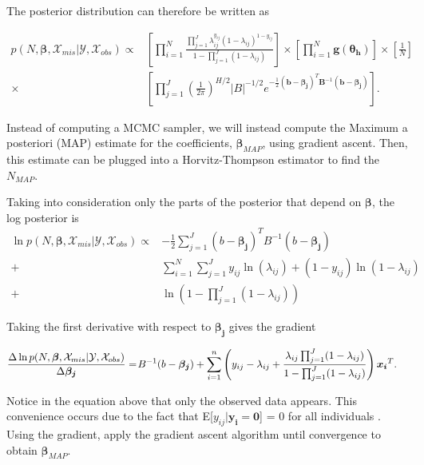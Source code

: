 \documentclass[
  12pt,
]{article}
\begin{document}
The posterior distribution can therefore be written as

\begin{align}
\label{eqn:condposteriorderivevalues}
\nonumber p(N,\boldsymbol{\beta},\mathcal{X}_{mis}|\mathcal{Y},\mathcal{X}_{obs}) \propto &  \left[\prod_{i=1}^N \frac{\prod_{j=1}^J \lambda_{ij}^{y_{ij}}(1-\lambda_{ij})^{1-y_{ij}}}{1-\prod_{j=1}^J(1-\lambda_{ij})} \right] \times \left[ \prod_{i=1}^N \boldsymbol{g}(\boldsymbol{\theta_h}) \right] \times  \left[\frac{1}{N}\right] \\
\times & \left[ \prod_{j=1}^J \left(\frac{1}{2\pi}\right)^{H/2}|B|^{-1/2}e^{-\frac{1}{2}(\boldsymbol{b}-\boldsymbol{\beta_j})^T\boldsymbol{B}^{-1}(\boldsymbol{b}-\boldsymbol{\beta_j})}\right].
\end{align}

Instead of computing a MCMC sampler, we will instead compute the Maximum
a posteriori (MAP) estimate for the coefficients,
\(\boldsymbol{\beta}_{MAP}\), using gradient ascent. Then, this estimate
can be plugged into a Horvitz-Thompson estimator to find the
\(N_{MAP}\).

Taking into consideration only the parts of the posterior that depend on
\(\boldsymbol{\beta}\), the log posterior is \begin{align}
\nonumber \ln p(N,\boldsymbol{\beta},\mathcal{X}_{mis}|\mathcal{Y},\mathcal{X}_{obs}) \propto & -\frac{1}{2}\sum_{j=1}^J (b-\boldsymbol{\beta_j})^T B^{-1}(b-\boldsymbol{\beta_j}) \\
\nonumber + & \sum_{i=1}^N \sum_{j=1}^J y_{ij}\ln(\lambda_{ij}) + (1-y_{ij})\ln(1-\lambda_{ij}) \\ 
+  & \ln(1-\prod_{j=1}^J(1-\lambda_{ij}))
\end{align}

Taking the first derivative with respect to \(\boldsymbol{\beta_j}\)
gives the gradient

\begin{align}
\frac{\Delta \ln p(N,\boldsymbol{\beta},\mathcal{X}_{mis}|\mathcal{Y},\mathcal{X}_{obs})}{\Delta \boldsymbol{\beta_j}} = & \hspace{1px} B^{-1}(b-\boldsymbol{\beta_j}) + \sum_{i=1}^n \left(y_{ij}-\lambda_{ij}+\frac{\lambda_{ij}\prod_{j=1}^J(1-\lambda_{ij})}{1-\prod_{j=1}^J(1-\lambda_{ij})} \right)\boldsymbol{x_i}^T.
\end{align}

Notice in the equation above that only the observed data appears. This
convenience occurs due to the fact that
E{[}\(y_{ij}|\boldsymbol{y_i}= \boldsymbol{0}\){]} = 0 for all
individuals \citep{alho_logistic_1990}. Using the gradient, apply the
gradient ascent algorithm until convergence to obtain
\(\boldsymbol{\beta}_{MAP}\).
\end{document}
